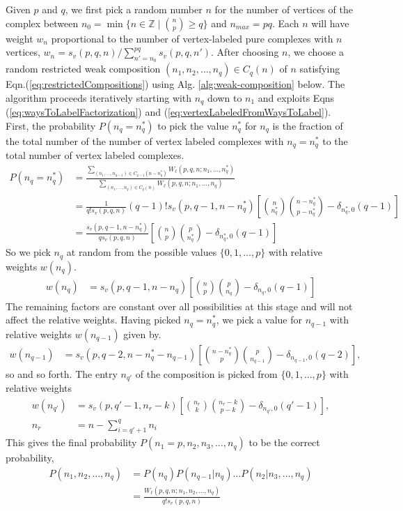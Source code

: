 \documentclass[12pt]{article}
\theoremstyle{plain}
\theoremstyle{definition}
\theoremstyle{remark}
\newcommand{\CR}{\nonumber\\}
\begin{document}
Given $p$ and $q$, we first pick a random number $n$ for the number of vertices of the complex between $n_{0} = \min{\{n \in \mathbb{Z} \mid \binom{n}{p}\geq q \}}$ and $n_{max} = pq$. Each $n$ will have weight $w_n$ proportional to the number of vertex-labeled pure complexes with $n$ vertices, $w_n=s_v(p,q,n)/\sum_{n'=n_0}^{pq}s_v(p,q,n')$. After choosing $n$, we choose a random restricted weak composition $(n_1,n_2,\dots,n_q)\in C_q(n)$ of $n$ satisfying Eqn.(\ref{eq:restrictedCompositions}) using Alg. \ref{alg:weak-composition} below. The algorithm proceeds iteratively starting with $n_q$ down to $n_1$ and exploits Eqns (\ref{eq:waysToLabelFactorization}) and (\ref{eq:vertexLabeledFromWaysToLabel}). First, the probability $P(n_q=n_q^*)$ to pick the value $n_q^*$ for $n_q$ is the fraction of the total number of the number of vertex labeled complexes with $n_q=n_q^*$ to the total number of vertex labeled complexes.
\begin{align}
    P(n_q=n_q^*)&=\frac{\sum_{(n_1,\dots,n_{q-1})\in C_{q-1}(n-n_q^*)}W_\ell(p,q,n;n_1,\dots,n_q^*)}{\sum_{(n_1,\dots,n_q)\in C_{q}(n)}W_\ell(p,q,n;n_1,\dots,n_q)}\CR
    &=\frac{1}{q!s_v(p,q,n)}(q-1)!s_v(p,q-1,n-n_q^*)\left[\binom{n}{n_q^*}\binom{n-n_q^*}{p-n_q^*}-\delta_{n_q^*,0}(q-1)\right]\CR
    &=\frac{s_v(p,q-1,n-n_q^*)}{qs_v(p,q,n)}\left[\binom{n}{p}\binom{p}{n_q^*}-\delta_{n_q^*,0}(q-1)\right]
\end{align}
So we pick $n_{q}$ at random from the possible values $\{0,1,\dots,p\}$ with relative weights $w(n_q)$.
\begin{align}
    w(n_{q}) &= s_v(p,q-1,n-n_q)\left[\binom{n}{p}\binom{p}{n_q}-\delta_{n_q,0}(q-1)\right]
\end{align}
The remaining factors are constant over all possibilities at this stage and will not affect the relative weights. Having picked $n_q=n_q^*$, we pick a value for $n_{q-1}$ with relative weights $w(n_{q-1})$ given by. 
\begin{align}
    w(n_{q-1}) &= s_v(p,q-2,n-n_q^*-n_{q-1})\left[\binom{n-n_q^*}{p}\binom{p}{n_{q-1}}-\delta_{n_{q-1},0}(q-2)\right],
\end{align}
so and so forth. The entry $n_{q'}$ of the composition is picked from $\{0,1,\dots,p\}$ with relative weights
\begin{align}
    w(n_{q'}) &= s_v(p,q'-1,n_r-k)\left[\binom{n_r}{k}\binom{n_r-k}{p-k}-\delta_{n_{q'},0}(q'-1)\right],\CR
    n_r&=n-\sum_{i=q'+1}^{q}n_i
\end{align}
This gives the final probability $P(n_1=p,n_2,n_3,\dots,n_q)$ to be the correct probability,
\begin{align}
    P(n_1,n_2,\dots,n_q)&=P(n_q)P(n_{q-1}|n_q)\dots P(n_2|n_3,\dots,n_q)\CR
    &=\frac{W_\ell(p,q,n;n_1,n_2,\dots,n_q)}{q!s_v(p,q,n)}
\end{align}
\end{document}
